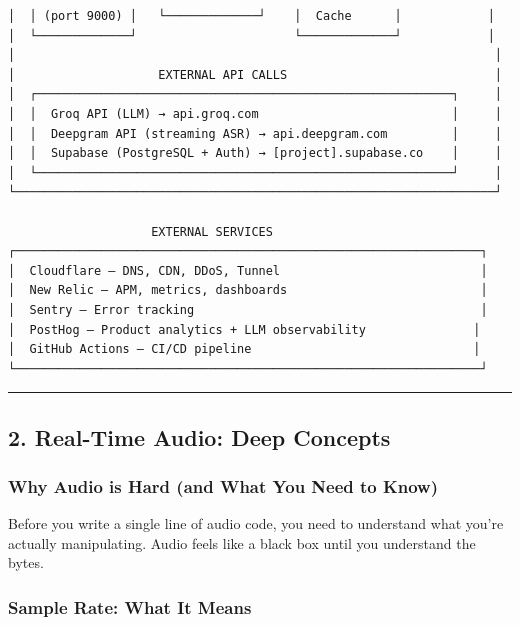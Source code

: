 \documentclass[
  11pt,
]{article}
\begin{document}
\begin{lstlisting}
│  │ (port 9000) │   └─────────────┘    │  Cache      │            │
│  └─────────────┘                      └─────────────┘            │
│                                                                   │
│                    EXTERNAL API CALLS                             │
│  ┌──────────────────────────────────────────────────────────┐     │
│  │  Groq API (LLM) → api.groq.com                           │     │
│  │  Deepgram API (streaming ASR) → api.deepgram.com         │     │
│  │  Supabase (PostgreSQL + Auth) → [project].supabase.co    │     │
│  └──────────────────────────────────────────────────────────┘     │
└───────────────────────────────────────────────────────────────────┘

                    EXTERNAL SERVICES
┌─────────────────────────────────────────────────────────────────┐
│  Cloudflare — DNS, CDN, DDoS, Tunnel                            │
│  New Relic — APM, metrics, dashboards                           │
│  Sentry — Error tracking                                        │
│  PostHog — Product analytics + LLM observability               │
│  GitHub Actions — CI/CD pipeline                               │
└─────────────────────────────────────────────────────────────────┘
\end{lstlisting}

\begin{center}\rule{0.5\linewidth}{0.5pt}\end{center}

\hypertarget{real-time-audio-deep-concepts}{%
\subsection{2. Real-Time Audio: Deep
Concepts}\label{real-time-audio-deep-concepts}}

\hypertarget{why-audio-is-hard-and-what-you-need-to-know}{%
\subsubsection{Why Audio is Hard (and What You Need to
Know)}\label{why-audio-is-hard-and-what-you-need-to-know}}

Before you write a single line of audio code, you need to understand
what you're actually manipulating. Audio feels like a black box until
you understand the bytes.

\hypertarget{sample-rate-what-it-means}{%
\subsubsection{Sample Rate: What It
Means}\label{sample-rate-what-it-means}}
\end{document}
